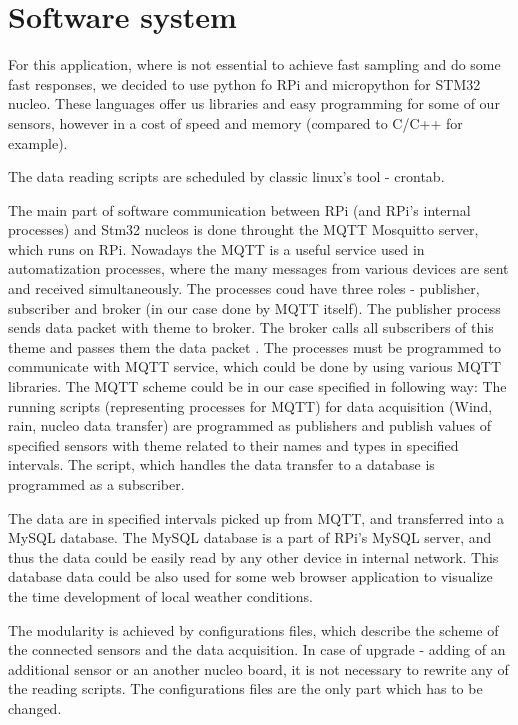 
\section{Software system}
For this application, where is not essential to achieve fast sampling and do some fast responses, we decided to use python fo RPi and micropython for STM32 nucleo. These languages offer us libraries and easy programming for some of our sensors, however in a cost of speed and memory (compared to C/C++ for example).
\par
The data reading scripts are scheduled by classic linux's tool - crontab.


\par
The main part of software communication between RPi (and RPi's internal processes) and Stm32 nucleos is done throught the MQTT Mosquitto server, which runs on RPi. Nowadays the MQTT is a useful service used in automatization processes, where the many messages from various devices are sent and received simultaneously. The processes coud have three roles - publisher, subscriber and broker (in our case done by MQTT itself). The publisher process sends data packet with theme to broker. The broker calls all subscribers of this theme and passes them the data packet \cite{MqttServ}. The processes must be programmed to communicate with MQTT service, which could be done by using various MQTT libraries. The MQTT scheme could be in our case specified in following way: The running scripts (representing processes for MQTT) for data acquisition (Wind, rain, nucleo data transfer) are programmed as publishers and publish values of specified sensors with theme related to their names and types in specified intervals. The script, which handles the data transfer to a database is programmed as a subscriber.


\par
The data are in specified intervals picked up from MQTT, and transferred into a MySQL database. The MySQL database is a part of RPi's MySQL server, and thus the data could be easily read by any other device in internal network. This database data could be also used for some web browser application to visualize the time development of local weather conditions.

\par
The modularity is achieved by configurations files, which describe the scheme of the connected sensors and the data acquisition. In case of upgrade - adding of an additional sensor or an another nucleo board, it is not necessary to rewrite any of the reading scripts. The configurations files are the only part which has to be changed.

